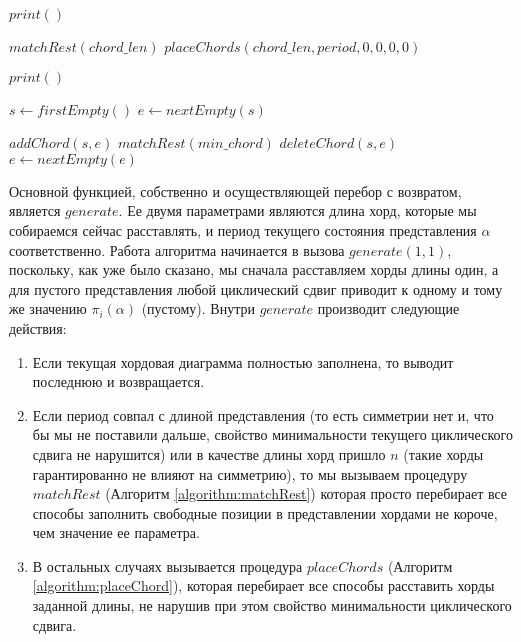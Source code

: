 \documentclass[a4paper,12pt]{article}
\theoremstyle{plain}
\theoremstyle{definition}
\begin{document}
\begin{algorithm}[!t]\label{algorithm:generate}\small
    \caption{\small$generate(chord\_len, period)$}
    \begin{algorithmic}[1]
            \STATE $print()$
            \RETURN
        \ENDIF

            \STATE $matchRest(chord\_len)$
        \ELSE
            \STATE $placeChords(chord\_len, period, 0, 0, 0, 0)$
        \ENDIF
    \end{algorithmic}
\end{algorithm}

\begin{algorithm}[!t]\label{algorithm:matchRest}\small
    \caption{\small$matchRest(min\_chord)$}
    \begin{algorithmic}[1]
            \STATE $print()$
            \RETURN
        \ENDIF

        \STATE $s \leftarrow firstEmpty()$
        \STATE $e \leftarrow nextEmpty(s)$

                \STATE $addChord(s, e)$
                \STATE $matchRest(min\_chord)$
                \STATE $deleteChord(s, e)$
            \ENDIF
            \STATE $e \leftarrow nextEmpty(e)$
        \ENDWHILE
    \end{algorithmic}
\end{algorithm}

Основной функцией, собственно и осуществляющей перебор с возвратом, является $generate$. Ее двумя параметрами являются длина
хорд, которые мы собираемся сейчас расставлять, и период текущего состояния представления $\alpha$ соответственно. Работа
алгоритма начинается в вызова $generate(1, 1)$, поскольку, как уже было сказано, мы сначала расставляем хорды длины один, а для
пустого представления любой циклический сдвиг приводит к одному и тому же значению $\pi_i(\alpha)$ (пустому). Внутри $generate$
производит следующие действия:
\begin{enumerate}
\item
Если текущая хордовая диаграмма полностью заполнена, то выводит последнюю и возвращается.
\item
Если период совпал с длиной представления (то есть симметрии нет и, что бы мы не поставили дальше, свойство минимальности
текущего циклического сдвига не нарушится) или в качестве длины хорд пришло $n$ (такие хорды гарантированно не влияют на
симметрию), то мы вызываем процедуру $matchRest$ (Алгоритм \ref{algorithm:matchRest}) которая просто перебирает все способы
заполнить свободные позиции в представлении хордами не короче, чем значение ее параметра.
\item
В остальных случаях вызывается процедура $placeChords$ (Алгоритм \ref{algorithm:placeChord}), которая перебирает все
способы расставить хорды заданной длины, не нарушив при этом свойство минимальности циклического сдвига.
\end{enumerate}
\end{document}
